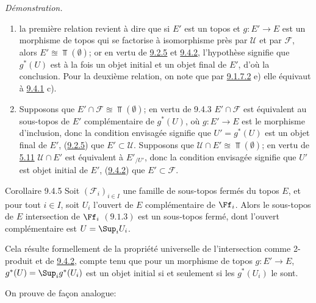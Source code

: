 \documentclass[10pt]{../fichiers-configuration-latex/smfart}
\begin{document}
\noindent \emph{Démonstration.}
\begin{enumerate}
\renewcommand{\theenumi}{\alph{enumi}}
\renewcommand{\labelenumi}{\theenumi)}
\item la première relation revient à dire que si $E'$ est un topos et
$g:E'\rightarrow E$ est un morphisme de topos qui se factorise à
isomorphisme près par $\mathcal{U}$ et par $\mathcal{F}$, alors
$E'\approxeq \Top(∅)$; or en vertu de \hyperref[IV.subsubsec9.2.5]{9.2.5} et
\hyperref[IV.prop9.4.2]{9.4.2}, l'hypothèse signifie que $g^{\ast}(U)$ est à la
fois un objet initial et un objet final de $E'$, d'où la conclusion.
Pour la deuxième relation, on note que par \hyperref[IV.exer9.1.7.2]{9.1.7.2} e)
elle équivaut à \hyperref[IV.prop9.4.1]{9.4.1} c).

\item Supposons que $E'\cap \mathcal{F}\approxeq \Top(∅)$; en vertu de
9.4.3 $E'\cap \mathcal{F}$ est équivalent au sous-topos de $E'$
    complémentaire de $g^{\ast}(U)$, où $g:E'\rightarrow E$ est le
    morphisme d'inclusion, donc la condition envisagée signifie que
    $U'=g^{\ast}(U)$ est un objet final de $E'$, \ie (\hyperref[IV.subsubsec9.2.5]{9.2.5}) que
    $E'\subset \mathcal{U}$. Supposons que $\mathcal{U}\cap E'\approxeq
    \Top(∅)$; en vertu de \hyperref[IV.prop5.11]{5.11} $\mathcal{U}\cap E'$ est équivalent à
    $E'_{/U'}$, donc la condition envisagée signifie que $U'$ est
    objet initial de $E'$, \ie (\hyperref[IV.prop9.4.2]{9.4.2}) que $E'\subset \mathcal{F}$.
\end{enumerate}

\begin{enonce*}{Corollaire 9.4.5}
Soit $(\mathcal{F}_i)_{i\in I}$ une famille de sous-topos fermés du
topos $E$, et pour tout $i\in I$, soit $U_i$ l'ouvert de $E$
complémentaire de $\Ff_i$. Alors le sous-topos de $E$ intersection
de $\Ff_i$ $(\hyperref[IV.prop9.1.3]{9.1.3})$ est un sous-topos fermé, dont
l'ouvert complémentaire est $U=\Sup_i U_i$.
\end{enonce*}

Cela résulte formellement de la propriété universelle de
l'intersection comme 2-produit et de \hyperref[IV.prop9.4.2]{9.4.2}, compte tenu
que pour un morphisme de topos $g:E'\rightarrow E$,
$g^{\ast}(U)=\Sup_i g^{\ast}(U_i)$ est un objet initial si et
seulement si les $g^{\ast}(U_i)$ le sont.

On prouve de façon analogue:
\end{document}
